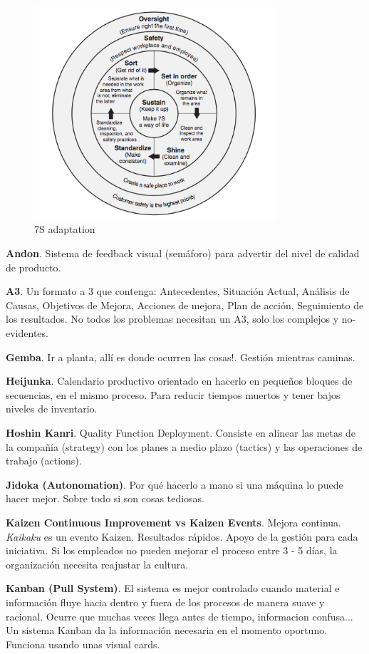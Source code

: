 \documentclass[]{article}
\begin{document}
\begin{figure}[ht!]
	\centering
	\includegraphics[width=90mm]{imagenes/7S.png}
	\caption{7S adaptation}
	\label{fig:Las7S}
\end{figure}


\textbf{Andon}. Sistema de feedback visual (semáforo) para advertir del nivel de calidad de producto.

\textbf{A3}. Un formato a 3 que contenga: Antecedentes, Situación Actual, Análisis de Causas, Objetivos de Mejora, Acciones de mejora, Plan de acción, Seguimiento de los resultados. No todos los problemas necesitan un A3, solo los complejos y no-evidentes.

\textbf{Gemba}. Ir a planta, allí es donde ocurren las cosas!. Gestión mientras caminas.

\textbf{Heijunka}. Calendario productivo orientado en hacerlo en pequeños bloques de secuencias, en el mismo proceso. Para reducir tiempos muertos y tener bajos niveles de inventario.

\textbf{Hoshin Kanri}. Quality Function Deployment. Consiste en alinear las metas de la compañía (strategy) con los planes a medio plazo (tactics) y las operaciones de trabajo (actions). 

\textbf{Jidoka (Autonomation)}. Por qué hacerlo a mano si una máquina lo puede hacer mejor. Sobre todo si son cosas tediosas. 

\textbf{Kaizen Continuous Improvement vs Kaizen Events}. Mejora continua. \textit{Kaikaku} es un evento Kaizen. Resultados rápidos. Apoyo de la gestión para cada iniciativa. Si los empleados no pueden mejorar el proceso entre 3 - 5 días, la organización necesita reajustar la cultura.

\textbf{Kanban (Pull System)}. El sistema es mejor controlado cuando material e información fluye hacia dentro y fuera de los procesos de manera suave y racional. Ocurre que muchas veces llega antes de tiempo, informacion confusa... Un sistema Kanban da la información necesaria en el momento oportuno. Funciona usando unas visual cards.
\end{document}
